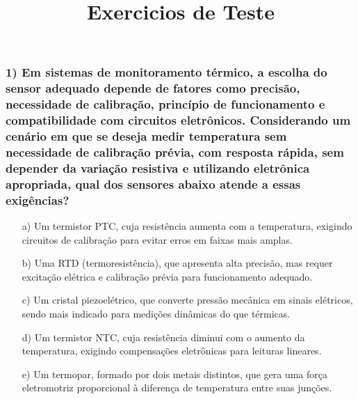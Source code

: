 \documentclass[12pt]{beamer}
\title{Exercicios de Teste}
\author{}
\date{}
\begin{document}
\frame{\titlepage}


\newcommand{\BodySize}{\footnotesize}

\begin{frame}
\frametitle{1) Em sistemas de monitoramento térmico, a escolha do sensor adequado depende de fatores como precisão, necessidade de calibração, princípio de funcionamento e compatibilidade com circuitos eletrônicos. Considerando um cenário em que se deseja medir temperatura sem necessidade de calibração prévia, com resposta rápida, sem depender da variação resistiva e utilizando eletrônica apropriada, qual dos sensores abaixo atende a essas exigências?}
{\BodySize
\begin{itemize}
\item[a)] Um termistor PTC, cuja resistência aumenta com a temperatura, exigindo circuitos de calibração para evitar erros em faixas mais amplas.
\item[b)] Uma RTD (termoresistência), que apresenta alta precisão, mas requer excitação elétrica e calibração prévia para funcionamento adequado.
\item[c)] Um cristal piezoelétrico, que converte pressão mecânica em sinais elétricos, sendo mais indicado para medições dinâmicas do que térmicas.
\item[d)] Um termistor NTC, cuja resistência diminui com o aumento da temperatura, exigindo compensações eletrônicas para leituras lineares.
\item[e)] Um termopar, formado por dois metais distintos, que gera uma força eletromotriz proporcional à diferença de temperatura entre suas junções.
\end{itemize}
}
\end{frame}
\end{document}
